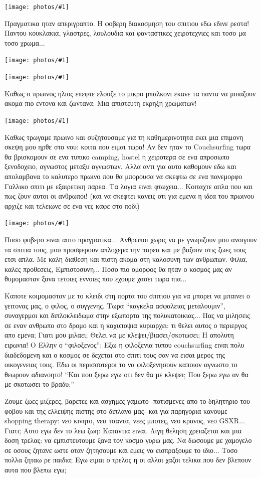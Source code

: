 \documentclass[11pt, letterpaper]{book}
\newcommand\photo[1]{\begin{center}\noindent\texttt{[image: photos/\#1]}\end{center}}
\begin{document}
\photo{83.jpg}

Πραγματικα ηταν απεριγραπτο. H φοβερη διακοσμηση του σπιτιου εδω εδινε ρεστα!
Παντου κουκλακια, γλαστρες, λουλουδια και φανταστικες χειροτεχνιες και τοσο μα τοσο χρωμα...

\photo{84.jpg}
\photo{85.jpg}

Καθως ο πρωινος ηλιος επεφτε ελουζε το μικρο μπαλκονι εκανε τα παντα να μοιαζουν ακομα πιο εντονα και ζωντανα: Μια απιστευτη εκρηξη χρωματων!

\photo{86.jpg}

Καθως τρωγαμε πρωινο και συζητουσαμε για τη καθημερινοτητα εκει μια επιμονη σκεψη μου ηρθε στο νου: κοιτα που ειμαι τωρα! Αν δεν ηταν το Couchsurfing τωρα θα βρισκομουν σε ενα τυπικο camping, hostel η χειροτερα σε ενα απροσωπο ξενοδοχειο, αγνωστος μεταξυ αγνωστων.
Αλλα αντι για αυτο καθομουν εδω και απολαμβανα το καλυτερο πρωινο που θα μπορουσα να σκεφτω σε ενα πανεμορφο Γαλλικο σπιτι με εξαιρετικη παρεα.
Τα λογια ειναι φτωχεια... Κοιταχτε απλα που και πως ζουν αυτοι οι ανθρωποι! (και να σκεφτει κανεις οτι για εμενα η ιδεα του πρωινου αρχιζε και τελειωνε σε ενα νες καφε στο ποδι)

\photo{87.jpg}

Ποσο φοβερο ειναι αυτο πραγματικα... Ανθρωποι χωρις να με γνωριζουν μου ανοιγουν τα σπιτια τους, μου προσφερουν απλοχερα την παρεα και με βαζουν στις ζωες τους ετσι απλα. Με καλη διαθεση και πιστη ακομα στη καλοσυνη των ανθρωπων.
Φιλια, καλες προθεσεις, Εμπιστοσυνη... Ποσο πιο ομορφος θα ηταν ο κοσμος μας αν θυμομασταν ξανα τετοιες εννοιες που εχουμε χασει τωρα πια...

Καποτε κοιμομασταν με το κλειδι στη πορτα του σπιτιου για να μπορει να μπαινει ο γειτονας μας, ο φιλος, ο συγγενης. Τωρα ``καγκελα ασφαλειας μεταλουμιν'', συναγερμοι και διπλοκλειδωμα στην εξωπορτα της πολυκατοικιας...
Πας να μιλησεις σε εναν ανθρωπο στο δρομο και η καχυποψια κυριαρχει: τι θελει αυτος ο περιεργος απο εμενα; Γιατι μου μιλαει; Θελει να με κλεψει/βιασει/σκοτωσει;
Η απολυτη ειρωνια! Ο Ελλην ο ``φιλοξενος'': Εξω η φιλοξενια τυπου couchsurfing ειναι πολυ διαδεδομενη και ο κοσμος σε δεχεται στο σπιτι τους σαν να εισαι μερος της οικογενειας τους. Εδω οι περισσοτεροι το να φιλοξενησουν καποιον αγνωστο το θεωρουν αδιανοητο! ``Και που ξερω εγω οτι δεν θα με κλεψει; Που ξερω εγω αν θα με σκοτωσει το βραδυ;''

Ζουμε ζωες μιζερες, βαρετες και ασχημες γαμωτο -ποτισμενες απο το δηλητηριο του φοβου και της ελλειψης πιστης στο διπλανο μας- και για παρηγορια κανουμε shopping therapy: νεο κινητο, νεα τσαντα, νεες μποτες, νεο κρανος, νεο GSXR... Γιατι;
Αυτο εγω δεν το λεω ζωη: Καταντια ειναι. Λιγη θεληση χρειαζεται και μια δοση τρελας: να εμπιστευτουμε ξανα τον κοσμο γυρω μας. Να δωσουμε με χαμογελο σε οσους ζητανε ωστε οταν ζητησουμε και εμεις να εισπραξουμε το ιδιο... Τοσο πολλα ζηταω ρε παιδια; Εγω ειμαι ο τρελος η οι αλλοι χαζοι τελικα που δεν βλεπουν αυτα που βλεπω εγω;
\end{document}
